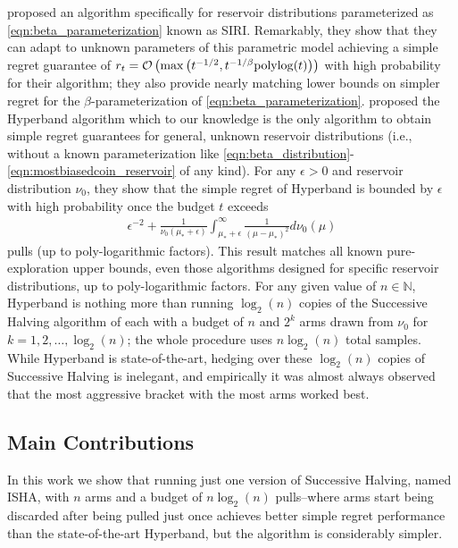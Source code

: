 \citet{DBLP:journals/corr/CarpentierV15} proposed an algorithm specifically for  reservoir distributions parameterized as \eqref{eqn:beta_parameterization} known as SIRI.
Remarkably, they show that they can adapt to unknown parameters of this parametric model achieving a simple regret guarantee of  $r_t=\mathcal{O}\left( \max\left(t^{-1/2}, t^{-1/\beta}{\rm polylog}(t)\right)\right)$ with high probability for their algorithm; they also provide nearly matching lower bounds on simpler regret for the $\beta$-parameterization of \eqref{eqn:beta_parameterization}.
\citet{li2017hyperband} proposed the Hyperband algorithm which to our knowledge is the only algorithm to obtain simple regret guarantees for general, unknown reservoir distributions (i.e., without a known parameterization like \eqref{eqn:beta_distribution}-\eqref{eqn:mostbiasedcoin_reservoir} of any kind).
For any $\epsilon>0$ and reservoir distribution $\nu_0$, they show that the simple regret of Hyperband is bounded by $\epsilon$ with high probability once the budget $t$ exceeds 
\begin{align}\label{eqn:rough_sample_complexity}
\epsilon^{-2} + \tfrac{1}{\nu_0(\mu_* + \epsilon)}\int_{\mu_*+\epsilon}^\infty \tfrac{1}{(\mu-\mu_*)^2} d\nu_0(\mu)
\end{align}
pulls (up to poly-logarithmic factors).
This result matches all known pure-exploration upper bounds, even those algorithms designed for specific reservoir distributions, up to poly-logarithmic factors.
For any given value of $n \in \mathbb{N}$, Hyperband is nothing more than running $\log_2(n)$ copies of the Successive Halving algorithm of \cite{icml2013_karnin13} each with a budget of $n$ and $2^k$ arms drawn from $\nu_0$ for $k=1,2,\dots,\log_2(n)$; the whole procedure uses $n \log_2(n)$ total samples. 
While Hyperband is state-of-the-art, hedging over these $\log_2(n)$ copies of Successive Halving is inelegant, and empirically it was almost always observed that the most aggressive bracket with the most arms worked best. 


\subsection{Main Contributions}
In this work we show that running just one version of Successive Halving, named ISHA, with $n$ arms and a budget of $n\log_2(n)$ pulls--where arms start being discarded after being pulled just once achieves better simple regret performance than the state-of-the-art Hyperband, but the algorithm is considerably simpler.

